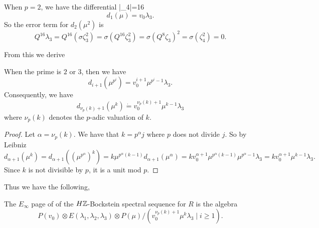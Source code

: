 When $p=2$, we have the differential |\sigma \xi_4|=16
\[
d_1(\mu)=v_0\lambda_3.
\]
So the error term for $d_2(\mu^2)$ is 
\[
Q^{16}\lambda_3 = Q^{16}(\sigma\zeta_3^2) = \sigma(Q^{16}\zeta_3^2) = \sigma(Q^8\zeta_3)^2 = \sigma(\zeta_4^2)=0.
\]

From this we derive

\begin{prop}
	When the prime is $2$ or $3$, then we have 
	\[
	d_{i+1}(\mu^{p^i}) = v_0^{i+1}\mu^{p^i-1}\lambda_3.
	\]
	Consequently, we have 
	\[
	d_{\nu_p(k)+1}(\mu^k) \dot{=}v_0^{\nu_p(k)+1}\mu^{k-1}\lambda_3
	\]
	where $\nu_p(k)$ denotes the $p$-adic valuation of $k$.
\end{prop}
\begin{proof}
	Let $\alpha=\nu_p(k)$. We have that $k=p^\alpha j$ where $p$ does not divide $j$. So by Leibniz
	\[
	d_{\alpha+1}(\mu^{k}) = d_{\alpha+1}((\mu^{p^\alpha})^k) = k\mu^{p^{\alpha}(k-1)}d_{\alpha+1}(\mu^{\alpha}) = kv_0^{\alpha+1}\mu^{p^\alpha (k-1)}\mu^{p^{\alpha}-1}\lambda_3 = kv_0^{\alpha+1}\mu^{k-1}\lambda_3.
	\]
	Since $k$ is not divisible by $p$, it is a unit mod $p$.
\end{proof}
Thus we have the following,
\begin{cor}
The $E_\infty$ page of of the $H\mathbb{Z}$-Bockstein spectral sequence for $R$ is the algebra
\[
P(v_0)\otimes E(\lambda_1,\lambda_2,\lambda_3)\otimes P(\mu)/(v_0^{\nu_p(k)+1}\mu^k\lambda_3\mid i\geq 1).
\]	
\end{cor}

